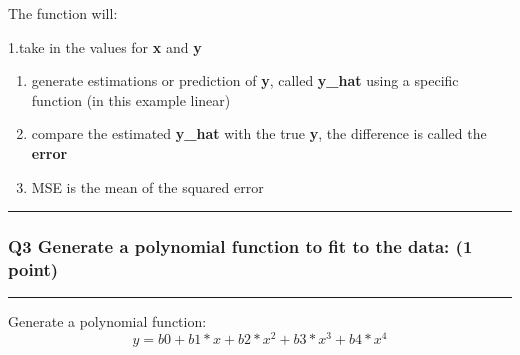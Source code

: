 \documentclass[]{article}
\newenvironment{Shaded}{\begin{snugshade}}{\end{snugshade}}
\newcommand{\KeywordTok}[1]{\textcolor[rgb]{0.13,0.29,0.53}{\textbf{#1}}}
\newcommand{\DecValTok}[1]{\textcolor[rgb]{0.00,0.00,0.81}{#1}}
\newcommand{\StringTok}[1]{\textcolor[rgb]{0.31,0.60,0.02}{#1}}
\newcommand{\ControlFlowTok}[1]{\textcolor[rgb]{0.13,0.29,0.53}{\textbf{#1}}}
\newcommand{\OperatorTok}[1]{\textcolor[rgb]{0.81,0.36,0.00}{\textbf{#1}}}
\newcommand{\NormalTok}[1]{#1}
\begin{document}
The function will:

1.take in the values for \textbf{x} and \textbf{y}

\begin{enumerate}
\def\labelenumi{\arabic{enumi}.}
\setcounter{enumi}{1}
\item
  generate estimations or prediction of \textbf{y}, called
  \textbf{y\_hat} using a specific function (in this example linear)
\item
  compare the estimated \textbf{y\_hat} with the true \textbf{y}, the
  difference is called the \textbf{error}
\item
  MSE is the mean of the squared error
\end{enumerate}

\begin{Shaded}
\end{Shaded}

\begin{center}\rule{0.5\linewidth}{\linethickness}\end{center}

\subsubsection{Q3 Generate a polynomial function to fit to the data: (1
point)}\label{q3-generate-a-polynomial-function-to-fit-to-the-data-1-point}

\begin{center}\rule{0.5\linewidth}{\linethickness}\end{center}

Generate a polynomial function: \[y=b0+b1*x+b2*x^2+b3*x^3+b4*x^4\]
\end{document}
